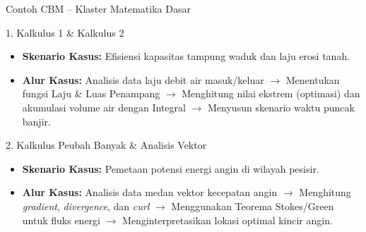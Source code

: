 \documentclass[aspectratio=169]{beamer} %
\begin{document}

\begin{frame}{Contoh CBM – Klaster Matematika Dasar}
    \begin{block}{1. Kalkulus 1 \& Kalkulus 2}
        \begin{itemize}
            \item \textbf{Skenario Kasus:} Efisiensi kapasitas tampung waduk dan laju erosi tanah.
            \item \textbf{Alur Kasus:} Analisis data laju debit air masuk/keluar $\rightarrow$ Menentukan fungsi Laju \& Luas Penampang $\rightarrow$ Menghitung nilai ekstrem (optimasi) dan akumulasi volume air dengan Integral $\rightarrow$ Menyusun skenario waktu puncak banjir.
        \end{itemize}
    \end{block}

    \begin{block}{2. Kalkulus Peubah Banyak \& Analisis Vektor}
        \begin{itemize}
            \item \textbf{Skenario Kasus:} Pemetaan potensi energi angin di wilayah pesisir.
            \item \textbf{Alur Kasus:} Analisis data medan vektor kecepatan angin $\rightarrow$ Menghitung \textit{gradient}, \textit{divergence}, dan \textit{curl} $\rightarrow$ Menggunakan Teorema Stokes/Green untuk fluks energi $\rightarrow$ Menginterpretasikan lokasi optimal kincir angin.
        \end{itemize}
    \end{block}
\end{frame}
\end{document}
